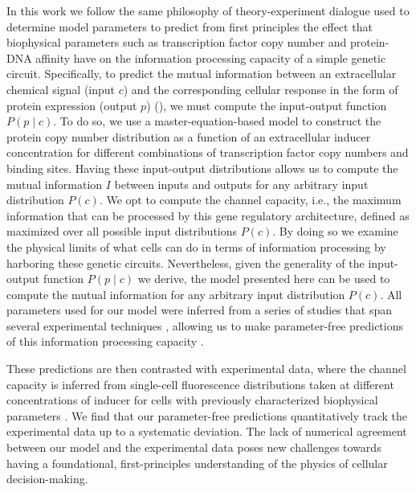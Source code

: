 In this work we follow the same philosophy of theory-experiment dialogue used
to determine model parameters to predict from first principles the effect that
biophysical parameters such as transcription factor copy number and protein-DNA
affinity have on the information processing capacity of a simple genetic
circuit. Specifically, to predict the mutual information between an
extracellular chemical signal (input $c$) and the corresponding cellular
response in the form of protein expression (output $p$)
(), we must compute the input-output function $P(p \mid
c)$. To do so, we use a master-equation-based model to construct the protein
copy number distribution as a function of an extracellular inducer
concentration for different combinations of transcription factor copy numbers
and binding sites. Having these input-output distributions allows us to compute
the mutual information $I$ between inputs and outputs for any arbitrary input
distribution $P(c)$. We opt to compute the channel capacity, i.e., the maximum
information that can be processed by this gene regulatory architecture, defined
as  maximized over all possible input distributions
$P(c)$. By doing so we examine the physical limits of what cells can do in
terms of information processing by harboring these genetic circuits.
Nevertheless, given the generality of the input-output function $P(p \mid c)$
we derive, the model presented here can be used to compute the mutual
information for any arbitrary input distribution $P(c)$. All parameters used
for our model were inferred from a series of studies that span several
experimental techniques \cite{Garcia2011c, Jones2014a, Brewster2014,
Razo-Mejia2018}, allowing us to make parameter-free predictions of this
information processing capacity \cite{Phillips2019}.

These predictions are then contrasted with experimental data, where the channel
capacity is inferred from single-cell fluorescence distributions taken at
different concentrations of inducer for cells with previously characterized
biophysical parameters \cite{Garcia2011c, Razo-Mejia2018}. We find that our
parameter-free predictions quantitatively track the experimental data up to a
systematic deviation. The lack of numerical agreement between our model and the
experimental data poses new challenges towards having a foundational,
first-principles understanding of the physics of cellular decision-making.

